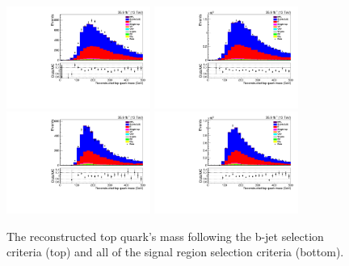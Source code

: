 \begin{figure}[ht]
\centering
\includegraphics[width=0.42\textwidth]{figs/background-estimation/plots/unblinded/prompt_ee_ttbarInc/topMass_NPL_ee_bTag_ee.pdf}
\includegraphics[width=0.42\textwidth]{figs/background-estimation/plots/unblinded/prompt_mumu_ttbarInc/topMass_NPL_mumu_bTag_mumu.pdf}
\\
\includegraphics[width=0.42\textwidth]{figs/background-estimation/plots/unblinded/prompt_ee_ttbarInc/topMass_NPL_ee_wMass_ee.pdf}
\includegraphics[width=0.42\textwidth]{figs/background-estimation/plots/unblinded/prompt_mumu_ttbarInc/topMass_NPL_mumu_wMass_mumu.pdf}
\caption{
The reconstructed top quark's mass following the b-jet selection criteria (top) and all of the signal region selection criteria (bottom).
}
\label{fig:App_SR_topMass}
\end{figure}


